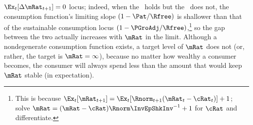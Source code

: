 \documentclass[BufferStockTheory]{subfiles}
\begin{document}
$\Ex_{t}[\Delta \mRat_{t+1}]=0$ locus; indeed, when the \RIC~holds but
the \GIC~does not, the consumption function's limiting slope
$(1-\Pat/\Rfree)$ is shallower than that of the sustainable consumption
locus $(1-\PGroAdj/\Rfree)$,\footnote{This is because
  $\Ex_{t}[\mRat_{t+1}]=\Ex_{t}[\Rnorm_{t+1}(\mRat_{t}-\cRat_{t})]+1$; solve $\mRat = (\mRat - \cRat)\Rnorm \InvEpShkInv^{-1}+1$ for $\cRat$ and differentiate.}
so the gap between the two actually increases with $\mRat$ in the
limit.  Although a nondegenerate consumption function
exists, a target level of $\mRat$ does not (or, rather, the
target is $\mRat=\infty$), because no matter how wealthy a consumer
becomes, the consumer will always spend less than the amount that
would keep $\mRat$ stable (in expectation).

\renewcommand{\figFile}{FVACnotGIC}
\hypertarget{\figFile}{}

\end{document}
